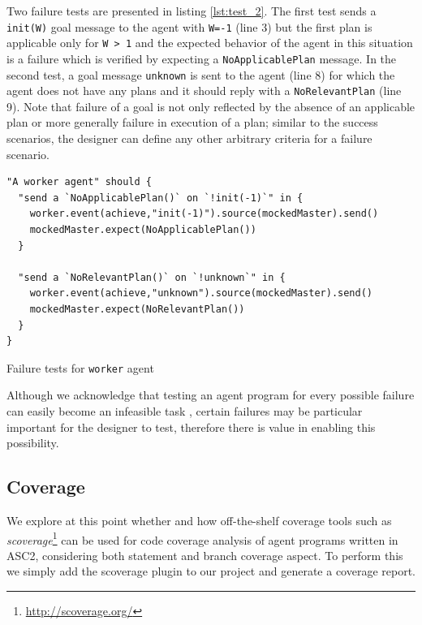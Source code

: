 Two failure tests are presented in listing \ref{lst:test_2}. The first test sends a \texttt{init(W)} goal message to the agent with \texttt{W=-1} (line 3) but the first plan is applicable only for \texttt{W > 1} and the expected behavior of the agent in this situation is a failure which is verified by expecting a \texttt{NoApplicablePlan} message. In the second test, a goal message \texttt{unknown} is sent to the agent (line 8) for which the agent does not have any plans and it should reply with a \texttt{NoRelevantPlan} (line 9). Note that failure of a goal is not only reflected by the absence of an applicable plan or more generally failure in execution of a plan; similar to the success scenarios, the designer can define any other arbitrary criteria for a failure scenario.

\begin{listing}[!tb]
\centering
\begin{verbatim}
"A worker agent" should {
  "send a `NoApplicablePlan()` on `!init(-1)`" in {
    worker.event(achieve,"init(-1)").source(mockedMaster).send()
    mockedMaster.expect(NoApplicablePlan())
  } 
  
  "send a `NoRelevantPlan()` on `!unknown`" in {
    worker.event(achieve,"unknown").source(mockedMaster).send()
    mockedMaster.expect(NoRelevantPlan())
  }
}
\end{verbatim}
\vspace{-5pt}
    \caption{Failure tests for \texttt{worker} agent}
    \label{lst:test_2}
\vspace{-5pt}
\end{listing}


Although we acknowledge that testing an agent program for every possible failure can easily become an infeasible task \cite{Winikoff2015,Winikoff2017}, certain failures may be particular important for the designer to test, therefore there is value in enabling this possibility.

\subsection{Coverage}


We explore at this point whether and how off-the-shelf coverage tools such as \textit{scoverage}\footnote{\url{http://scoverage.org/}} can be used for code coverage analysis of agent programs written in ASC2, considering both statement and branch coverage aspect. To perform this we simply add the scoverage plugin to our project and generate a coverage report.


